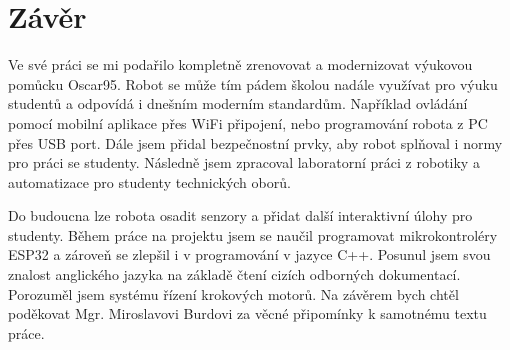 \newpage
\chapter*{Závěr}

Ve své práci se mi podařilo kompletně zrenovovat a modernizovat výukovou pomůcku Oscar95. Robot se může tím pádem školou nadále využívat pro výuku studentů a odpovídá i dnešním moderním standardům. Například ovládání pomocí mobilní aplikace přes WiFi připojení, nebo programování robota z PC přes USB port. Dále jsem přidal bezpečnostní prvky, aby robot splňoval i normy pro práci se studenty. Následně jsem zpracoval laboratorní práci z robotiky a automatizace pro studenty technických oborů. 

Do budoucna lze robota osadit senzory a přidat další interaktivní úlohy pro studenty. Během práce na projektu jsem se naučil programovat mikrokontroléry ESP32 a zároveň se zlepšil i v programování v jazyce C++. Posunul jsem svou znalost anglického jazyka na základě čtení cizích odborných dokumentací. Porozuměl jsem systému řízení krokových motorů. 
Na závěrem bych chtěl poděkovat Mgr. Miroslavovi Burdovi za věcné připomínky k samotnému textu práce.
